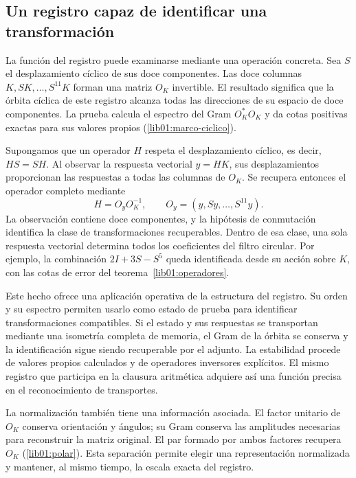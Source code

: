 \subsection*{Un registro capaz de identificar una transformación}
\label{libnar:identificacion}

La función del registro puede examinarse mediante una operación
concreta. Sea \(S\) el desplazamiento cíclico de sus doce
componentes. Las doce columnas
\(K,SK,\ldots,S^{11}K\) forman una matriz \(O_K\) invertible.
El resultado significa que la órbita cíclica de este registro alcanza
todas las direcciones de su espacio de doce componentes. La prueba
calcula el espectro del Gram \(O_K^*O_K\) y da cotas positivas
exactas para sus valores propios (\cref{lib01:marco-ciclico}).

Supongamos que un operador \(H\) respeta el desplazamiento cíclico,
es decir, \(HS=SH\). Al observar la respuesta vectorial \(y=HK\),
sus desplazamientos proporcionan las respuestas a todas las columnas
de \(O_K\). Se recupera entonces el operador completo mediante
\[
 H=O_yO_K^{-1},\qquad
 O_y=(y,Sy,\ldots,S^{11}y).
\]
La observación contiene doce componentes, y la hipótesis de
conmutación identifica la clase de transformaciones recuperables.
Dentro de esa clase, una sola respuesta vectorial determina todos
los coeficientes del filtro circular. Por ejemplo, la combinación
\(2I+3S-S^5\) queda identificada desde su acción sobre \(K\),
con las cotas de error del teorema~\ref{lib01:operadores}.

Este hecho ofrece una aplicación operativa de la estructura del
registro. Su orden y su espectro permiten usarlo como estado de
prueba para identificar transformaciones compatibles. Si el estado
y sus respuestas se transportan mediante una isometría completa de
memoria, el Gram de la órbita se conserva y la identificación sigue
siendo recuperable por el adjunto. La estabilidad procede de valores
propios calculados y de operadores inversores explícitos. El mismo
registro que participa en la clausura aritmética adquiere así una
función precisa en el reconocimiento de transportes.

La normalización también tiene una información asociada. El factor
unitario de \(O_K\) conserva orientación y ángulos; su Gram
conserva las amplitudes necesarias para reconstruir la matriz
original. El par formado por ambos factores recupera \(O_K\)
(\cref{lib01:polar}). Esta separación permite elegir una
representación normalizada y mantener, al mismo tiempo, la escala
exacta del registro.

